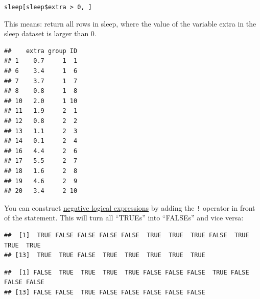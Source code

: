 \documentclass[
]{book}
\newenvironment{Shaded}{\begin{snugshade}}{\end{snugshade}}
\newcommand{\DecValTok}[1]{\textcolor[rgb]{0.00,0.00,0.81}{#1}}
\newcommand{\NormalTok}[1]{#1}
\newcommand{\SpecialCharTok}[1]{\textcolor[rgb]{0.81,0.36,0.00}{\textbf{#1}}}
\begin{document}
\texttt{sleep{[}sleep\$extra\ \textgreater{}\ 0,\ {]}}

This means: return all rows in sleep, where the value of the variable extra in the sleep dataset is larger than 0.

\begin{Shaded}
\end{Shaded}

\begin{verbatim}
##    extra group ID
## 1    0.7     1  1
## 6    3.4     1  6
## 7    3.7     1  7
## 8    0.8     1  8
## 10   2.0     1 10
## 11   1.9     2  1
## 12   0.8     2  2
## 13   1.1     2  3
## 14   0.1     2  4
## 16   4.4     2  6
## 17   5.5     2  7
## 18   1.6     2  8
## 19   4.6     2  9
## 20   3.4     2 10
\end{verbatim}

You can construct \ul{negative logical expressions} by adding the \texttt{!} operator in front of the statement. This will turn all ``TRUEs'' into ``FALSEs'' and vice versa:

\begin{Shaded}
\end{Shaded}

\begin{verbatim}
##  [1]  TRUE FALSE FALSE FALSE FALSE  TRUE  TRUE  TRUE FALSE  TRUE  TRUE  TRUE
## [13]  TRUE  TRUE FALSE  TRUE  TRUE  TRUE  TRUE  TRUE
\end{verbatim}

\begin{Shaded}
\end{Shaded}

\begin{verbatim}
##  [1] FALSE  TRUE  TRUE  TRUE  TRUE FALSE FALSE FALSE  TRUE FALSE FALSE FALSE
## [13] FALSE FALSE  TRUE FALSE FALSE FALSE FALSE FALSE
\end{verbatim}
\end{document}
